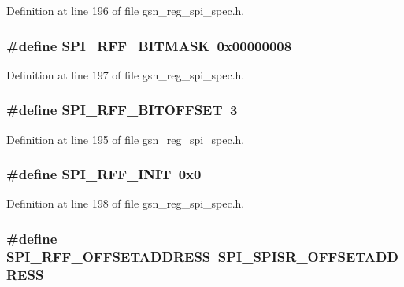 Definition at line 196 of file gsn\_\-reg\_\-spi\_\-spec.h.

\hypertarget{a00573_a4c19120c481d2ba121c0fcb48ae6ea12}{
\subsubsection[{SPI\_\-RFF\_\-BITMASK}]{\setlength{\rightskip}{0pt plus 5cm}\#define SPI\_\-RFF\_\-BITMASK~0x00000008}}
\label{a00573_a4c19120c481d2ba121c0fcb48ae6ea12}


Definition at line 197 of file gsn\_\-reg\_\-spi\_\-spec.h.

\hypertarget{a00573_a4a6e5829b0d6a2f2afa1a9696fe99fd3}{
\subsubsection[{SPI\_\-RFF\_\-BITOFFSET}]{\setlength{\rightskip}{0pt plus 5cm}\#define SPI\_\-RFF\_\-BITOFFSET~3}}
\label{a00573_a4a6e5829b0d6a2f2afa1a9696fe99fd3}


Definition at line 195 of file gsn\_\-reg\_\-spi\_\-spec.h.

\hypertarget{a00573_acaa7e7382ebe717b20ab3ebdc79343ef}{
\subsubsection[{SPI\_\-RFF\_\-INIT}]{\setlength{\rightskip}{0pt plus 5cm}\#define SPI\_\-RFF\_\-INIT~0x0}}
\label{a00573_acaa7e7382ebe717b20ab3ebdc79343ef}


Definition at line 198 of file gsn\_\-reg\_\-spi\_\-spec.h.

\hypertarget{a00573_abe9d2f5dbfce9ab6a16ead77b76fbece}{
\subsubsection[{SPI\_\-RFF\_\-OFFSETADDRESS}]{\setlength{\rightskip}{0pt plus 5cm}\#define SPI\_\-RFF\_\-OFFSETADDRESS~SPI\_\-SPISR\_\-OFFSETADDRESS}}
\label{a00573_abe9d2f5dbfce9ab6a16ead77b76fbece}


